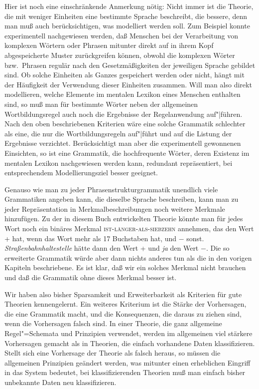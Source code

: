 Hier ist noch eine einschränkende Anmerkung nötig: Nicht immer ist die Theorie, die mit weniger
Einheiten eine bestimmte Sprache beschreibt, die bessere, denn man muß auch berücksichtigen,
was modelliert werden soll. Zum Beispiel konnte experimentell nachgewiesen werden, daß
Menschen bei der Verarbeitung von komplexen Wörtern oder Phrasen mitunter direkt auf in ihrem
Kopf abgespeicherte Muster zurückgreifen können, obwohl die komplexen Wörter bzw.\ Phrasen
regulär nach den Gesetzmäßigkeiten der jeweiligen Sprache gebildet sind. Ob solche Einheiten
als Ganzes gespeichert werden oder nicht, hängt mit der Häufigkeit der Verwendung dieser
Einheiten zusammen. Will man also direkt modellieren, welche Elemente im mentalen Lexikon eines
Menschen enthalten sind, so muß man für bestimmte Wörter neben der allgemeinen Wortbildungsregel
auch noch die Ergebnisse der Regelanwendung auf"|führen. Nach den oben beschriebenen Kriterien
wäre eine solche Grammatik schlechter als eine, die nur die Wortbildungsregeln auf"|führt
und auf die Listung der Ergebnisse verzichtet. Berücksichtigt man aber die experimentell gewonnenen
Einsichten, so ist eine Grammatik, die hochfrequente Wörter, deren Existenz im mentalen Lexikon
nachgewiesen werden kann, redundant repräsentiert, bei entsprechendem Modellierungsziel besser geeignet.

Genauso wie man zu jeder Phrasenstrukturgrammatik unendlich viele Grammatiken angeben kann,
die dieselbe Sprache beschreiben,
kann man zu jeder Repräsentation in Merkmalbeschreibungen noch weitere Merkmale hinzufügen. Zu der
in diesem Buch entwickelten Theorie könnte man für jedes Wort noch ein binäres
Merkmal \textsc{ist-länger-als-siebzehn} annehmen, das den Wert + hat, wenn das Wort mehr als 17 Buchstaben
hat, und $-$ sonst. \emph{Straßenbahnhaltestelle} hätte dann den Wert + und \emph{ja} den Wert $-$.
Die so erweiterte Grammatik würde aber dann nichts anderes tun als die in den vorigen Kapiteln
beschriebene. Es ist klar, daß wir ein solches Merkmal nicht brauchen und daß die Grammatik
ohne dieses Merkmal besser ist.

Wir haben also bisher Sparsamkeit und Erweiterbarkeit als Kriterien für gute Theorien
kennengelernt. Ein weiteres Kriterium ist die Stärke der Vorhersagen, die eine Grammatik macht,
und die Konsequenzen, die daraus zu ziehen sind, wenn die Vorhersagen falsch sind.
In einer Theorie, die ganz allgemeine Regel"=Schemata und Prinzipien verwendet, werden im allgemeinen
viel stärkere Vorhersagen gemacht als in Theorien, die einfach vorhandene Daten klassifizieren.
Stellt sich eine Vorhersage der Theorie als falsch heraus, so müssen die allgemeinen Prinzipien
geändert werden, was mitunter einen erheblichen Eingriff in das System bedeutet,
bei klassifizierenden Theorien muß man einfach bisher unbekannte Daten neu klassifizieren.

